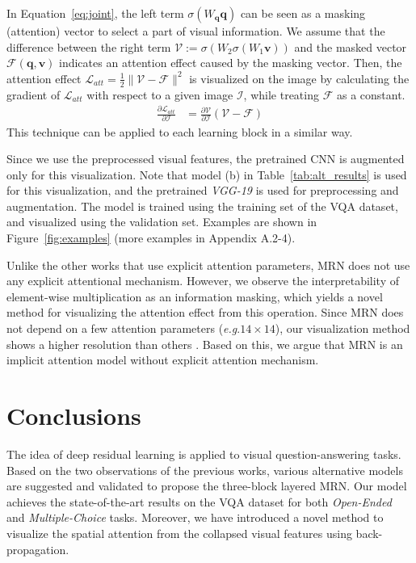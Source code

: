 \documentclass{article}
\newcommand{\vv}[0]{\mathbf{v}}
\newcommand{\vq}[0]{\mathbf{q}}
\newcommand{\onedot}[0]{.\xspace}
\newcommand{\eg}[0]{\emph{e.g}\onedot}
\begin{document}
In Equation~\ref{eq:joint}, the left term $\sigma(W_{\vq}\vq)$ can be seen as a masking (attention) vector to select a part of visual information. We assume that the difference between the right term $\mathcal{V} := \sigma(W_{2} \sigma(W_{1} \vv))$ and the masked vector $\mathcal{F}(\vq,\vv)$ indicates an attention effect caused by the masking vector. Then, the attention effect $\mathcal{L_{\textit{att}}}=\frac{1}{2}\lVert\mathcal{V}-\mathcal{F}\rVert^2$ is visualized on the image by calculating the gradient of $\mathcal{L_{\textit{att}}}$ with respect to a given image $\mathcal{I}$, while treating $\mathcal{F}$ as a constant. \begin{align}
  \frac{\partial \mathcal{L_{\textit{att}}}}{\partial \mathcal{I}} &= \frac{\partial \mathcal{V}}{\partial \mathcal{I}} (\mathcal{V} - \mathcal{F})
\end{align}
This technique can be applied to each learning block in a similar way. 

Since we use the preprocessed visual features, the pretrained CNN is augmented only for this visualization. Note that model (b) in Table~\ref{tab:alt_results} is used for this visualization, and the pretrained \textit{VGG-19} is used for preprocessing and augmentation. The model is trained using the training set of the VQA dataset, and visualized using the validation set. Examples are shown in Figure~\ref{fig:examples} (more examples in Appendix A.2-4). 

Unlike the other works \cite{Yang2015,Xiong2016} that use explicit attention parameters, MRN does not use any explicit attentional mechanism. However, we observe the interpretability of element-wise multiplication as an information masking, which yields a novel method for visualizing the attention effect from this operation. Since MRN does not depend on a few attention parameters (\eg $14 \times 14$), our visualization method shows a higher resolution than others \cite{Yang2015,Xiong2016}. Based on this, we argue that MRN is an implicit attention model without explicit attention mechanism.

\section{Conclusions}

The idea of deep residual learning is applied to visual question-answering tasks. Based on the two observations of the previous works, various alternative models are suggested and validated to propose the three-block layered MRN. Our model achieves the state-of-the-art results on the VQA dataset for both \textit{Open-Ended} and \textit{Multiple-Choice} tasks. Moreover, we have introduced a novel method to visualize the spatial attention from the collapsed visual features using back-propagation. 
\end{document}
